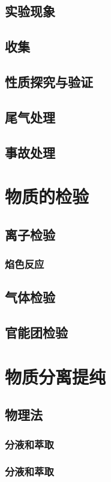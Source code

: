 \documentclass[a4paper]{article}
\begin{document}
	\subsection{实验现象}
	\subsection{收集}
	\subsection{性质探究与验证}
	\subsection{尾气处理}
	\subsection{事故处理}
	
	\clearpage
	\section{物质的检验}
	\subsection{离子检验}
	\subsubsection{焰色反应}
	\subsection{气体检验}
	\subsection{官能团检验}
	
	\clearpage
	\section{物质分离提纯}
	\subsection{物理法}
	\subsubsection{分液和萃取}
	\subsubsection{分液和萃取}
\end{document}
